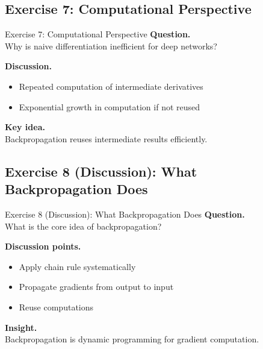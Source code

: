 \documentclass[aspectratio=169,11pt]{beamer}
\begin{document}
\subsection{Exercise 7: Computational Perspective}
\begin{frame}[t,allowframebreaks]{Exercise 7: Computational Perspective}
\small
\textbf{Question.}\\ Why is naive differentiation inefficient for deep networks?

\textbf{Discussion.}\\ \begin{itemize}
    \item Repeated computation of intermediate derivatives
    \item Exponential growth in computation if not reused
\end{itemize}

\textbf{Key idea.}\\ Backpropagation reuses intermediate results efficiently.
\end{frame}

\subsection{Exercise 8 (Discussion): What Backpropagation Does}
\begin{frame}[t,allowframebreaks]{Exercise 8 (Discussion): What Backpropagation Does}
\small
\textbf{Question.}\\ What is the core idea of backpropagation?

\textbf{Discussion points.}\\ \begin{itemize}
    \item Apply chain rule systematically
    \item Propagate gradients from output to input
    \item Reuse computations
\end{itemize}

\textbf{Insight.}\\ Backpropagation is dynamic programming for gradient computation.
\end{frame}
\end{document}
